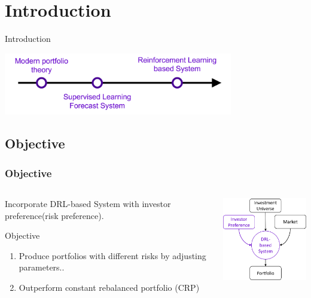  \section{Introduction}


\begin{frame}{Introduction}
       \tableofcontents[sectionstyle=show/hide, hideothersubsections]
    \begin{center}
    \includegraphics[width=10cm]{images/portfolio_introduction.png}
    \end{center}
\end{frame}


\subsection{Objective}
\begin{frame}
\frametitle{Objective}
\begin{columns}
\begin{column}{0.55\textwidth}
Incorporate DRL-based System with investor preference(\alert{risk preference}).


\begin{block}{Objective}
\begin{enumerate}
    \item Produce portfolios with different risks by adjusting parameters..
    \item Outperform constant rebalanced portfolio (CRP)
\end{enumerate}
\end{block}
\end{column}
\begin{column}{0.45\textwidth}
\begin{center}
\includegraphics[width=4.8cm]{images/rl2.png}
\end{center}
\end{column}
\end{columns}
\end{frame}


